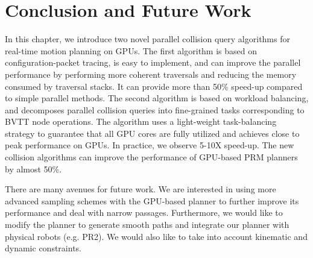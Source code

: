\section{Conclusion and Future Work}
In this chapter, we introduce two novel parallel collision query algorithms for real-time motion planning on GPUs.
The first algorithm is based on configuration-packet tracing, is easy to implement, and can improve the parallel
performance by performing more coherent traversals and reducing the memory consumed by traversal stacks. It can provide
more than 50\% speed-up compared to simple parallel methods. The second algorithm is based on workload balancing, and
decomposes parallel collision queries into fine-grained tasks corresponding to  BVTT node operations. The algorithm
uses a light-weight task-balancing strategy to guarantee that all GPU cores are fully utilized and achieves
close to peak performance on GPUs. In practice, we observe 5-10X speed-up. The new collision algorithms can improve
the performance of GPU-based PRM planners by almost 50\%.

There are many avenues for future work. We are interested in using more advanced sampling schemes with the
GPU-based planner to further improve its performance and deal with narrow passages. Furthermore, we would like to
modify the planner to generate smooth paths and integrate our planner with physical robots (e.g. PR2).
We would also like to take into account kinematic and dynamic constraints.
